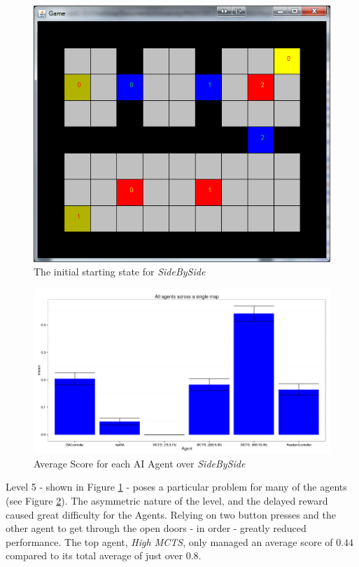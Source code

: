 \documentclass{IEEEtran}
\begin{document}
\begin{figure}[!ht]
\centering
\includegraphics[scale=0.5]{level5}
\caption{The initial starting state for \emph{SideBySide}}
\label{Level5State}
\end{figure}

\begin{figure}[!ht]
\centering
\includegraphics[width = \linewidth]{level5-txt-scores}
\caption{Average Score for each AI Agent over \emph{SideBySide}}
\label{avgScoreMap5}
\end{figure}

Level 5 - shown in Figure \ref{Level5State} - poses a particular problem for many of the agents (see Figure \ref{avgScoreMap5}). The asymmetric nature of the level, and the delayed reward caused great difficulty for the Agents. Relying on two button presses and the other agent to get through the open doors - in order - greatly reduced performance. The top agent, \emph{High MCTS}, only managed an average score of $0.44$ compared to its total average of just over $0.8$.
\end{document}
